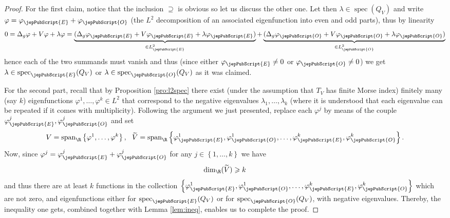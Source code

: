         	\begin{proof}
        		For the first claim, notice that the inclusion $\supseteq$ is obvious so let us discuss the other one. Let then $\lambda \in \operatorname{spec} (Q_V)$ and write $\varphi=\varphi_{{\jepPubScript{E}}}+\varphi_{{\jepPubScript{O}}}$ (the $L^2$ decomposition of an associated eigenfunction into even and odd parts), thus by linearity
        		\[
        		0=\Delta_g \varphi+V\varphi+\lambda\varphi= \underbrace{(\Delta_g \varphi_{{\jepPubScript{E}}}+V\varphi_{{\jepPubScript{E}}}+\lambda\varphi_{{\jepPubScript{E}}})}_{\in L^2_{{\jepPubScript{E}}} } + \underbrace{(\Delta_g \varphi_{{\jepPubScript{O}}}+V\varphi_{{\jepPubScript{O}}}+\lambda\varphi_{{\jepPubScript{O}}})}_{\in L^2_{{\jepPubScript{O}}}}
        		\]
        		hence each of the two summands must vanish and thus (since either $\varphi_{{\jepPubScript{E}}}\neq 0$ or $\varphi_{{\jepPubScript{O}}}\neq 0$) we get $\lambda\in \operatorname{spec}_{{\jepPubScript{E}}} (Q_V)$ or $\lambda\in \operatorname{spec}_{{\jepPubScript{O}}} (Q_V)$ as it was claimed.
        		
        		
        		
        		For the second part, recall that by Proposition \ref{pro:l2spec} there exist (under the assumption that $T_V$ has finite Morse index) finitely many (say $k$) eigenfunctions $\varphi^1,\ldots,\varphi^k \in L^2$ that correspond to the negative eigenvalues $\lambda_1,\ldots,\lambda_k$ (where it is understood that each eigenvalue can be repeated if it comes with multiplicity). 
        		Following the argument we just presented, replace each $\varphi^j$ by means of the couple $\varphi^j_{{\jepPubScript{E}}}, \varphi^j_{{\jepPubScript{O}}}$ and set
        		\[
        		V=\operatorname{span}_{\R}\left\{\varphi^1,\ldots,\varphi^k \right\}, \ \ \widetilde{V}=\operatorname{span}_{\R}\left\{\varphi^1_{{\jepPubScript{E}}}, \varphi^1_{{\jepPubScript{O}}},\ldots, \varphi^k_{{\jepPubScript{E}}}, \varphi^k_{{\jepPubScript{O}}} \right\}.
        		\] 
        		Now, since $\varphi^j=\varphi^j_{{\jepPubScript{E}}}+\varphi^j_{{\jepPubScript{O}}}$ for any $j\in\left\{1,\ldots, k\right\}$ we have
        		\[
        		\text{dim}_{\R}(\widetilde{V})\geqslant k
        		\]
        		and thus there are at least $k$ functions in the collection $\left\{\varphi^1_{{\jepPubScript{E}}}, \varphi^1_{{\jepPubScript{O}}},\ldots, \varphi^k_{{\jepPubScript{E}}}, \varphi^k_{{\jepPubScript{O}}} \right\}$ which are not zero, and eigenfunctions either for $\operatorname{spec}_{{\jepPubScript{E}}} (Q_V)$  or for $\operatorname{spec}_{{\jepPubScript{O}}} (Q_V)$, with negative eigenvalues. Thereby, the inequality one gets, combined together with Lemma \ref{lem:ineq}, enables us to complete the proof.
        	\end{proof}	
        	
        	
        	
